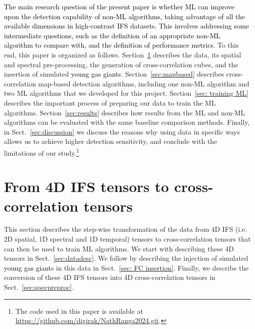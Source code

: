 \documentclass{aa}
\newcommand{\newchange}[1]{\textcolor{black}{#1}}
\begin{document}
\newchange{The main research question of the present paper is whether ML can improve upon the detection capability of non-ML algorithms, taking advantage of all the available dimensions in high-contrast IFS datasets. This involves addressing some intermediate questions, such as the definition of an appropriate non-ML algorithm to compare with, and the definition of performance metrics.}
To this end, this paper is organized as follows. Section~\ref{sec:data} describes the data, its spatial and spectral pre-processing, the generation of cross-correlation cubes, and the insertion of simulated \newchange{young gas giants}.
Section~\ref{sec:mapbased} describes cross-correlation map-based detection algorithms, including one non-ML algorithm and two ML algorithms that we   developed for this project.
Section~\ref{sec: training ML} describes the important process of preparing our data to train the ML algorithms.
Section~\ref{sec:results} describes how results from the ML and non-ML algorithms can be evaluated with the same baseline comparison methods.
Finally, in Sect.~\ref{sec:discussion} we discuss the reasons why using data in specific ways allows us to achieve higher detection sensitivity, and conclude with the limitations of our study.\footnote{The code used in this paper is available at \url{https://github.com/digirak/NathRanga2024.git}.}\\
\section{From 4D IFS tensors to cross-correlation tensors}\label{sec:data}

This section describes the step-wise transformation of the data from 4D IFS (i.e. 2D spatial, 1D spectral and 1D temporal) tensors to cross-correlation tensors that can then be used to train ML algorithms.
We start with describing these 4D tensors in Sect.~\ref{sec:datadesc}.
We follow by  describing the injection of simulated \newchange{young gas giant}s in this data in Sect.~\ref{sec: FC insertion}.
Finally, we describe the conversion of these 4D IFS tensors into 4D cross-correlation tensors in Sect.~\ref{sec:specpreproc}.
\end{document}
